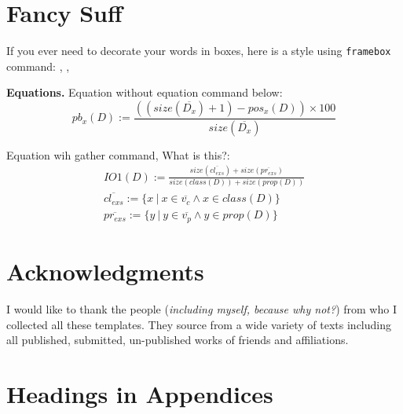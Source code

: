\documentclass{sig-alternate-05-2015}
\begin{document}


\section{Fancy Suff}\label{fancies}

If you ever need to decorate your words in boxes, here is a style using \texttt{{\color{cyan}framebox}} command: , , 

\textbf{Equations.} Equation without equation command below:
$$ pb_x(D) := \frac{((\mathit{size}(\overline{D_x}) + 1) - \mathit{pos_x}(\mathit{D})) \times 100}{size(\overline{D_x})}$$


Equation wih gather command, What is this?:
\begin{gather*}
\mathit{IO1}(D) := \frac{\mathit{size}(\overline{\mathit{cl_{exs}}}) + \mathit{size}(\overline{\mathit{pr_{exs}}})}{\mathit{size}(\mathit{class}(D)) + \mathit{size}(\mathit{prop}(D))} \\
\overline{\mathit{cl_{exs}}} := \{x~|~x \in \overline{v_c} \wedge x \in \mathit{class}(D) \} \\
\overline{\mathit{pr_{exs}}} := \{y~|~y \in \overline{v_p} \wedge y \in \mathit{prop}(D)\}
\end{gather*}

\section{Acknowledgments}
I would like to thank the people (\textit{including myself, because why not?}) from who I collected all these templates. They source from a wide variety of texts including all published, submitted, un-published works of friends and affiliations. 


\appendix

\section{Headings in Appendices}
\end{document}
